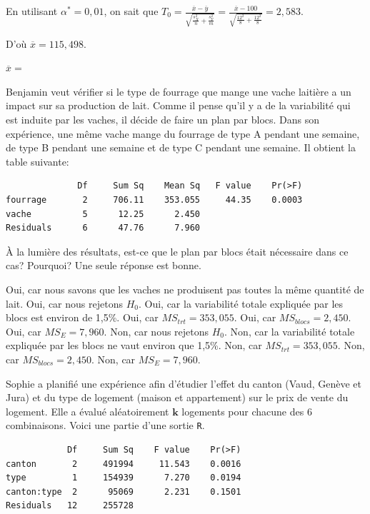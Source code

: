 \begin{questions}
\begin{solution}
En utilisant $\alpha^*=0,01$, on sait que $T_0=\frac{\overline{x}-\overline{y}}{\sqrt{\frac{s_X^2}{n}+\frac{s_Y^2}{m}}}=\frac{\overline{x}-100}{\sqrt{\frac{12^2}{8}+\frac{12^2}{8}}}=2,583$.

D'où $\overline{x}=115,498$.

\end{solution}

\vfill
$\overline{x}=$
\newpage 


\question[4]  Benjamin veut vérifier si le type de fourrage que mange une vache laitière a un impact sur sa production de lait.
Comme il pense qu'il y a de la variabilité qui est induite par les vaches, il décide de faire un plan par blocs. 
Dans son expérience, une même vache mange du fourrage de type A pendant une semaine, de type B pendant une semaine et de type C pendant une semaine.
Il obtient la table suivante:

\begin{verbatim}
              Df     Sum Sq    Mean Sq   F value    Pr(>F)   
fourrage       2     706.11    353.055     44.35    0.0003 
vache          5      12.25      2.450      
Residuals      6      47.76      7.960
\end{verbatim}

À la lumière des résultats, est-ce que le plan par blocs était nécessaire dans ce cas? Pourquoi? Une seule réponse est bonne.
\begin{checkboxes}
\choice Oui, car nous savons que les vaches ne produisent pas toutes la même quantité de lait.
\choice Oui, car nous rejetons $H_0$.
\choice Oui, car la variabilité totale expliquée par les blocs est environ de 1,5\%.
\choice Oui, car $MS_{trt}=353,055$.
\choice Oui, car $MS_{blocs}=2,450$.
\choice Oui, car $MS_{E}=7,960$.
\choice Non, car nous rejetons $H_0$.
\correctchoice Non, car la variabilité totale expliquée par les blocs ne vaut environ que 1,5\%.
\choice Non, car $MS_{trt}=353,055$.
\choice Non, car $MS_{blocs}=2,450$.
\choice Non, car $MS_{E}=7,960$.

\end{checkboxes}


\question Sophie a planifié une expérience afin d'étudier l'effet du canton (Vaud, Genève et Jura) et du type de logement (maison et appartement) sur le prix de vente du logement. Elle a évalué aléatoirement $\boldsymbol{k}$ logements pour chacune des 6 combinaisons. Voici une partie d'une sortie \texttt{R}.
\begin{verbatim}
            Df     Sum Sq    F value    Pr(>F)   
canton       2     491994     11.543    0.0016 
type         1     154939      7.270    0.0194  
canton:type  2      95069      2.231    0.1501   
Residuals   12     255728  
\end{verbatim}


\end{questions}
